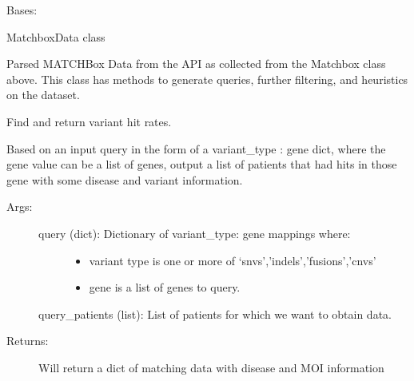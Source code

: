 \documentclass[letterpaper,10pt,english]{sphinxmanual}
\begin{document}
\begin{fulllineitems}
\label{\detokenize{matchbox_api_utils:matchbox_api_utils.MatchData}}
Bases: 

MatchboxData class

Parsed MATCHBox Data from the API as collected from the Matchbox class above. This
class has methods to generate queries, further filtering, and heuristics on the
dataset.

\begin{fulllineitems}
\label{\detokenize{matchbox_api_utils:matchbox_api_utils.MatchData.find_variant_frequency}}
Find and return variant hit rates.

Based on an input query in the form of a variant\_type : gene dict, where the gene value
can be a list of genes, output a list of patients that had hits in those gene with some
disease and variant information.
\begin{description}
\item[{Args:}] \leavevmode\begin{description}
\item[{query (dict): Dictionary of variant\_type: gene mappings where:}] \leavevmode\begin{itemize}
\item {} 
variant type is one or more of ‘snvs’,’indels’,’fusions’,’cnvs’

\item {} 
gene is a list of genes to query.

\end{itemize}

\end{description}

query\_patients (list): List of patients for which we want to obtain data.

\item[{Returns:}] \leavevmode
Will return a dict of matching data with disease and MOI information

\end{description}


\end{fulllineitems}
\end{fulllineitems}
\end{document}
